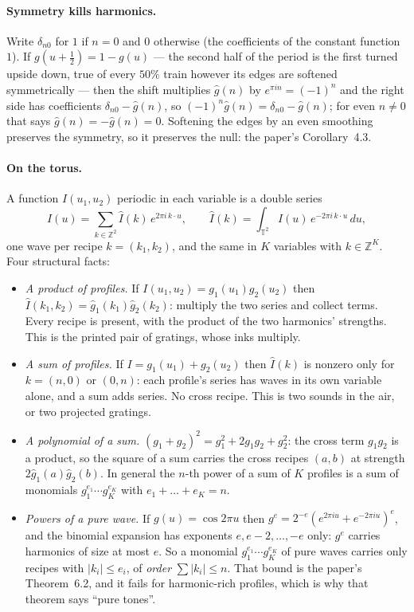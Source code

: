 \documentclass[10pt]{article}
\theoremstyle{plain}
\theoremstyle{definition}
\newcommand{\Z}{\mathbb{Z}}
\newcommand{\tor}{\mathbb{T}}
\begin{document}
\paragraph{Symmetry kills harmonics.}
Write $\delta_{n0}$ for $1$ if $n=0$ and $0$ otherwise (the coefficients of
the constant function $1$). If $g(u+\tfrac12)=1-g(u)$ --- the second half
of the period is the first turned upside down, true of every $50\%$ train
however its edges are softened symmetrically --- then the shift multiplies
$\hat g(n)$ by $e^{\pi in}=(-1)^n$ and the right side has coefficients
$\delta_{n0}-\hat g(n)$, so $(-1)^n\hat g(n)=\delta_{n0}-\hat g(n)$; for
even $n\ne0$ that says $\hat g(n)=-\hat g(n)=0$. Softening the edges by an
even smoothing preserves the symmetry, so it preserves the null: the
paper's Corollary~4.3.

\paragraph{On the torus.}
A function $I(u_1,u_2)$ periodic in each variable is a double series
\[
  I(u)=\sum_{k\in\Z^2}\hat I(k)\,e^{2\pi i\,k\cdot u},\qquad
  \hat I(k)=\int_{\tor^2}I(u)\,e^{-2\pi i\,k\cdot u}\,du,
\]
one wave per recipe $k=(k_1,k_2)$, and the same in $K$ variables with
$k\in\Z^K$. Four structural facts:
\begin{itemize}
\item \emph{A product of profiles.} If $I(u_1,u_2)=g_1(u_1)g_2(u_2)$ then
$\hat I(k_1,k_2)=\hat g_1(k_1)\hat g_2(k_2)$: multiply the two series and
collect terms. Every recipe is present, with the product of the two
harmonics' strengths. This is the printed pair of gratings, whose inks
multiply.
\item \emph{A sum of profiles.} If $I=g_1(u_1)+g_2(u_2)$ then $\hat I(k)$ is
nonzero only for $k=(n,0)$ or $(0,n)$: each profile's series has waves in
its own variable alone, and a sum adds series. No cross recipe. This is two
sounds in the air, or two projected gratings.
\item \emph{A polynomial of a sum.} $(g_1+g_2)^2=g_1^2+2g_1g_2+g_2^2$: the
cross term $g_1g_2$ is a product, so the square of a sum carries the cross
recipes $(a,b)$ at strength $2\hat g_1(a)\hat g_2(b)$. In general the $n$-th
power of a sum of $K$ profiles is a sum of monomials $g_1^{e_1}\cdots g_K^{e_K}$
with $e_1+\dots+e_K=n$.
\item \emph{Powers of a pure wave.} If $g(u)=\cos2\pi u$ then
$g^e=2^{-e}(e^{2\pi iu}+e^{-2\pi iu})^e$, and the binomial expansion has
exponents $e,e-2,\dots,-e$ only: $g^e$ carries harmonics of size at most
$e$. So a monomial $g_1^{e_1}\cdots g_K^{e_K}$ of pure waves carries only
recipes with $|k_i|\le e_i$, of \emph{order} $\sum|k_i|\le n$. That bound is
the paper's Theorem~6.2, and it fails for harmonic-rich profiles, which is
why that theorem says ``pure tones''.
\end{itemize}
\end{document}
